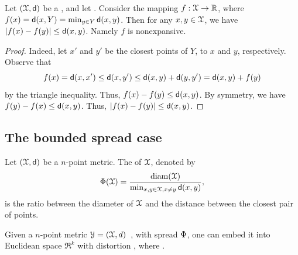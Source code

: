 \begin{lemma}
    Let $(\FMS,\DistChar)$ be a , and let
    . Consider
    the mapping $f:\FMS \rightarrow \Re$, where $f(x) = \mathsf{d}(x,Y)= 
    \min_{y \in Y} \mathsf{d}( x, y)$. Then for any $x,y \in \FMS$, we have
    $\left| {f(x) - f(y)} \right| \leq \mathsf{d}(x,y)$. Namely $f$ is
    nonexpansive.
\end{lemma}

\begin{proof}
    Indeed, let $x'$ and $y'$ be the closest points of $Y$, to $x$ and
    $y$, respectively. Observe that
    \begin{equation*}
        f(x)%
        =%
        \DistChar(x, x')%
        \leq%
        \DistChar(x,y')%
        \leq%
        \DistChar( x,y) + \DistChar(y, y')%
        =%
        \DistChar(x,y) + f(y)
    \end{equation*}
    by the triangle inequality. Thus, $f(x) - f(y) \leq \mathsf{d}(x,y)$.
    By symmetry, we have $f(y) - f(x) \leq \mathsf{d}(x,y)$. Thus,
    $\left| {f(x) - f(y)} \right| \leq \mathsf{d}(x,y)$.
\end{proof}


\subsection{The bounded spread case}

Let $(\FMS,\DistChar)$ be a $n$-point metric. The  of $\FMS$,
denoted by
\begin{equation*}
    \Spread(\FMS)%
    =%
    \frac{\diam(\FMS)}{\min_{x,y \in \FMS, x \ne y} \DistChar(x,y)},
\end{equation*}
 is the ratio between the diameter of $\FMS$
and the distance between the closest pair of points.

\begin{theorem}
    Given a $n$-point metric $\FMSC = (\FMS,d)$\ , with spread
    $\Phi$, one can embed it into Euclidean space $\Re^k$ with
    distortion\newline
    , where\newline
    .
\end{theorem}

